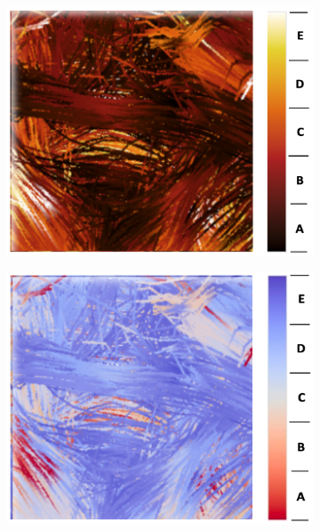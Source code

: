 \documentclass[hyperref, plainreport, noproblem]{cgvpub1}
\begin{document}
\begin{figure}[ht]
    \centering
    \begin{subfigure}[b]{0.45\textwidth}
    	\includegraphics[width =  \columnwidth]{blackbody-fa}
	\caption{ }
    \end{subfigure}
    \hspace{0.3cm}
    \begin{subfigure}[b]{0.45\textwidth}
    	\includegraphics[width =  \columnwidth]{coolwarm-fa}
	\caption{ }
    \end{subfigure}	
    \begin{subfigure}[b]{0.45\textwidth}

\end{subfigure}
\end{figure}
\end{document}
